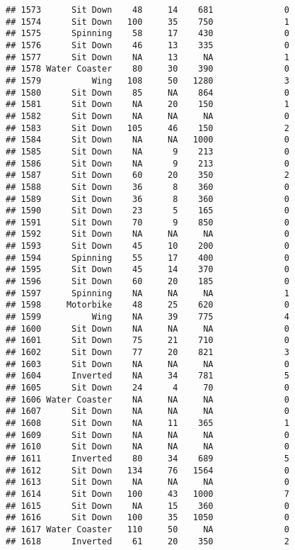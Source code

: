 \documentclass[
]{article}
\begin{document}
\begin{verbatim}
## 1573      Sit Down    48     14    681              0
## 1574      Sit Down   100     35    750              1
## 1575      Spinning    58     17    430              0
## 1576      Sit Down    46     13    335              0
## 1577      Sit Down    NA     13     NA              1
## 1578 Water Coaster    80     30    390              0
## 1579          Wing   108     50   1280              3
## 1580      Sit Down    85     NA    864              0
## 1581      Sit Down    NA     20    150              1
## 1582      Sit Down    NA     NA     NA              0
## 1583      Sit Down   105     46    150              2
## 1584      Sit Down    NA     NA   1000              0
## 1585      Sit Down    NA      9    213              0
## 1586      Sit Down    NA      9    213              0
## 1587      Sit Down    60     20    350              2
## 1588      Sit Down    36      8    360              0
## 1589      Sit Down    36      8    360              0
## 1590      Sit Down    23      5    165              0
## 1591      Sit Down    70      9    850              0
## 1592      Sit Down    NA     NA     NA              0
## 1593      Sit Down    45     10    200              0
## 1594      Spinning    55     17    400              0
## 1595      Sit Down    45     14    370              0
## 1596      Sit Down    60     20    185              0
## 1597      Spinning    NA     NA     NA              1
## 1598     Motorbike    48     25    620              0
## 1599          Wing    NA     39    775              4
## 1600      Sit Down    NA     NA     NA              0
## 1601      Sit Down    75     21    710              0
## 1602      Sit Down    77     20    821              3
## 1603      Sit Down    NA     NA     NA              0
## 1604      Inverted    NA     34    781              5
## 1605      Sit Down    24      4     70              0
## 1606 Water Coaster    NA     NA     NA              0
## 1607      Sit Down    NA     NA     NA              0
## 1608      Sit Down    NA     11    365              1
## 1609      Sit Down    NA     NA     NA              0
## 1610      Sit Down    NA     NA     NA              0
## 1611      Inverted    80     34    689              5
## 1612      Sit Down   134     76   1564              0
## 1613      Sit Down    NA     NA     NA              0
## 1614      Sit Down   100     43   1000              7
## 1615      Sit Down    NA     15    360              0
## 1616      Sit Down   100     35   1050              0
## 1617 Water Coaster   110     50     NA              0
## 1618      Inverted    61     20    350              2

\end{verbatim}
\end{document}
